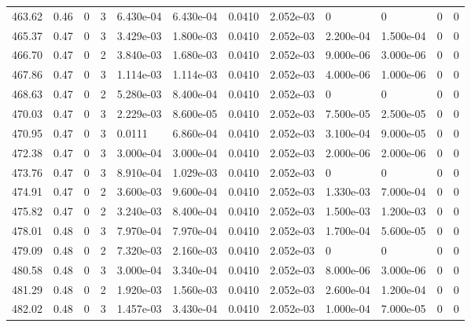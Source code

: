 \documentclass[preview]{standalone}
\begin{document}
{{{{{{{{{{{{{{{\begin{tabular}{L{1.2cm}C{1.2cm} C{0.3cm}C{0.5cm} C{1.4cm}C{1.4cm} C{1.4cm}C{1.4cm} C{1.6cm}C{1.6cm} C{1.6cm}C{1.6cm}}
  463.62  &  0.46  & 0     &  3 &  6.430e-04  & 6.430e-04  &  0.0410&   2.052e-03& 0 & 0   &  0 & 0  \\ 
  465.37  &  0.47  & 0     &  3 &  3.429e-03  & 1.800e-03  &  0.0410&   2.052e-03& 2.200e-04 & 1.500e-04   &  0 & 0  \\ 
  466.70  &  0.47  & 0     &  2 &  3.840e-03  & 1.680e-03  &  0.0410&   2.052e-03& 9.000e-06 & 3.000e-06   &  0 & 0  \\ 
  467.86  &  0.47  & 0     &  3 &  1.114e-03  & 1.114e-03  &  0.0410&   2.052e-03& 4.000e-06 & 1.000e-06   &  0 & 0  \\ 
  468.63  &  0.47  & 0     &  2 &  5.280e-03  & 8.400e-04  &  0.0410&   2.052e-03& 0 & 0   &  0 & 0  \\ 
  470.03  &  0.47  & 0     &  3 &  2.229e-03  & 8.600e-05  &  0.0410&   2.052e-03& 7.500e-05 & 2.500e-05   &  0 & 0  \\ 
  470.95  &  0.47  & 0     &  3 &  0.0111  & 6.860e-04  &  0.0410&   2.052e-03& 3.100e-04 & 9.000e-05   &  0 & 0  \\ 
  472.38  &  0.47  & 0     &  3 &  3.000e-04  & 3.000e-04  &  0.0410&   2.052e-03& 2.000e-06 & 2.000e-06   &  0 & 0  \\ 
  473.76  &  0.47  & 0     &  3 &  8.910e-04  & 1.029e-03  &  0.0410&   2.052e-03& 0 & 0   &  0 & 0  \\ 
  474.91  &  0.47  & 0     &  2 &  3.600e-03  & 9.600e-04  &  0.0410&   2.052e-03& 1.330e-03 & 7.000e-04   &  0 & 0  \\ 
  475.82  &  0.47  & 0     &  2 &  3.240e-03  & 8.400e-04  &  0.0410&   2.052e-03& 1.500e-03 & 1.200e-03   &  0 & 0  \\ 
  478.01  &  0.48  & 0     &  3 &  7.970e-04  & 7.970e-04  &  0.0410&   2.052e-03& 1.700e-04 & 5.600e-05   &  0 & 0  \\ 
  479.09  &  0.48  & 0     &  2 &  7.320e-03  & 2.160e-03  &  0.0410&   2.052e-03& 0 & 0   &  0 & 0  \\ 
  480.58  &  0.48  & 0     &  3 &  3.000e-04  & 3.340e-04  &  0.0410&   2.052e-03& 8.000e-06 & 3.000e-06   &  0 & 0  \\ 
  481.29  &  0.48  & 0     &  2 &  1.920e-03  & 1.560e-03  &  0.0410&   2.052e-03& 2.600e-04 & 1.200e-04   &  0 & 0  \\ 
  482.02  &  0.48  & 0     &  3 &  1.457e-03  & 3.430e-04  &  0.0410&   2.052e-03& 1.000e-04 & 7.000e-05   &  0 & 0  \\ 
\hline 
\end{tabular} 

}}}}}}}}}}}}}}}
\end{document}
